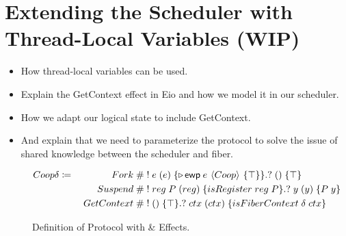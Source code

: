 \section{Extending the Scheduler with Thread-Local Variables (WIP)}
\label{sec:thread-local-vars}

\begin{itemize}
    \item How thread-local variables can be used.
    \item Explain the GetContext effect in Eio and how we model it in our scheduler.
    \item How we adapt our logical state to include GetContext.
    \item And explain that we need to parameterize the protocol to solve the issue of shared knowledge between the scheduler and fiber.
\end{itemize}

\begin{figure}[ht]
    \begin{alignat*}{2}
        Coop \delta \coloneqq\; &  & \quad Fork\; \#    & \; !\; e\; (e)\; \{\later \ewp{e}{Coop}{\top}\}. ?\; ()\; \{ \top \}        \\
                                &  & Suspend\;    \#    & \; !\; reg\; P\; (reg)\; \{isRegister\; reg\; P\}.?\; y\; (y)\; \{ P\; y \} \\
                                &  & GetContext\;    \# & \; !\; ()\; \{\top\}.?\; ctx\; (ctx)\; \{ isFiberContext\; \delta\; ctx \}
    \end{alignat*}
    \caption{Definition of \proto{} Protocol with \efork{} \& \esuspend{} Effects.}
    \label{fig:coop-protocol-ext}
\end{figure}



